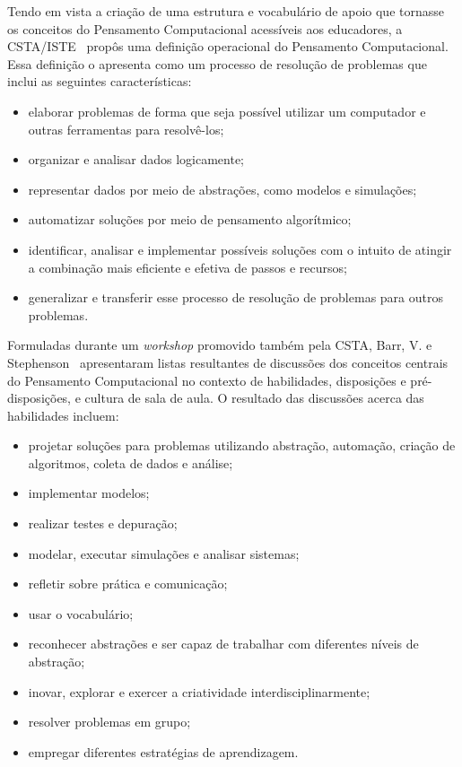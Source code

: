 Tendo em vista a criação de uma estrutura e vocabulário de apoio que tornasse os conceitos do Pensamento Computacional acessíveis aos educadores, a \acrshort{CSTA}/\acrshort{ISTE}~\cite{iste/csta_operational_2011} propôs uma definição operacional do Pensamento Computacional. Essa definição o apresenta como um processo de resolução de problemas que inclui as seguintes características:
\begin{itemize}
\item elaborar problemas de forma que seja possível utilizar um computador e outras ferramentas para resolvê-los;
\item organizar e analisar dados logicamente;
\item representar dados por meio de abstrações, como modelos e simulações;
\item automatizar soluções por meio de pensamento algorítmico;
\item identificar, analisar e implementar possíveis soluções com o intuito de atingir a combinação mais eficiente e efetiva de passos e recursos;
\item generalizar e transferir esse processo de resolução de problemas para outros problemas.
\end{itemize}

Formuladas durante um \textit{workshop} promovido também pela \acrshort{CSTA}, Barr, V. e Stephenson~\cite{barr_bringing_2011} apresentaram listas resultantes de discussões dos conceitos centrais do Pensamento Computacional no contexto de habilidades, disposições e pré-disposições, e cultura de sala de aula. O resultado das discussões acerca das habilidades incluem:
\begin{itemize}
\item projetar soluções para problemas utilizando abstração, automação, criação de algoritmos, coleta de dados e análise;
\item implementar modelos;
\item realizar testes e depuração;
\item modelar, executar simulações e analisar sistemas;
\item refletir sobre prática e comunicação;
\item usar o vocabulário;
\item reconhecer abstrações e ser capaz de trabalhar com diferentes níveis de abstração;
\item inovar, explorar e exercer a criatividade interdisciplinarmente;
\item resolver problemas em grupo;
\item empregar diferentes estratégias de aprendizagem.
\end{itemize}

